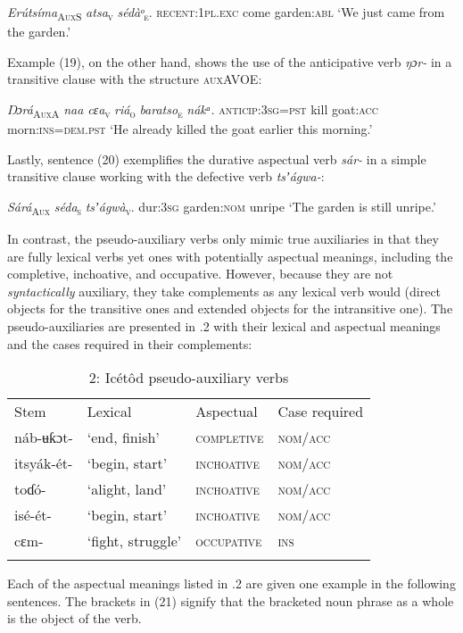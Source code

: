 \textit{Erúts}\textit{íma}\textsc{\textsubscript{AuxS}}   \textit{atsa}\textsc{\textsubscript{v}}\textit{     sédàᵒ}\textsc{\textsubscript{e}}.
\textsc{recent:1pl.exc}   come     garden:\textsc{abl}
‘We just came from the garden.’


Example (19), on the other hand, shows the use of the anticipative verb \textit{ŋɔr-} in a transitive clause with the structure \textsc{auxAVOE}:



\textit{Ŋ}\textit{ɔrá}\textsc{\textsubscript{AuxA}}\textit{ naa   cɛa}\textsc{\textsubscript{v}}\textit{   riá}\textsc{\textsubscript{o}}\textit{        baratso}\textsc{\textsubscript{e}}\textit{ nákᵃ.}
\textsc{anticip:3sg=pst}   kill   goat:\textsc{acc} morn:\textsc{ins=dem.pst}
‘He already killed the goat earlier this morning.’


Lastly, sentence (20) exemplifies the durative aspectual verb \textit{sár-} in a simple transitive clause working with the defective verb \textit{tsʼágwa-}:



\textit{Sárá}\textsc{\textsubscript{Aux}}\textit{  séda}\textsc{\textsubscript{s}}\textit{     tsʼágwà}\textsc{\textsubscript{v}}.
dur:\textsc{3sg}   garden:\textsc{nom}   unripe
‘The garden is still unripe.’


In contrast, the pseudo-auxiliary verbs only mimic true auxiliaries in that they are fully lexical verbs yet ones with potentially aspectual meanings, including the completive, inchoative, and occupative. However, because they are not \textit{syntactically} auxiliary, they take complements as any lexical verb would (direct objects for the transitive ones and extended objects for the intransitive one). The pseudo-auxiliaries are presented in .2 with their lexical and aspectual meanings and the cases required in their complements:


\begin{table}
\caption{2: Icétôd pseudo-auxiliary verbs}
\label{tab:10}


\begin{tabularx}{\textwidth}{XXXX}
\lsptoprule

Stem & Lexical & Aspectual & Case required\\
náb-ʉƙɔt- & ‘end, finish’ & \textsc{completive} & \textsc{nom/acc}\\
itsyák-ét- & ‘begin, start’ & \textsc{inchoative} & \textsc{nom/acc}\\
toɗó- & ‘alight, land’ & \textsc{inchoative} & \textsc{nom/acc}\\
isé-ét- & ‘begin, start’ & \textsc{inchoative} & \textsc{nom/acc}\\
cɛm- & ‘fight, struggle’ & \textsc{occupative} & \textsc{ins}\\
\lspbottomrule
\end{tabularx}
\end{table}
Each of the aspectual meanings listed in .2 are given one example in the following sentences. The brackets in (21) signify that the bracketed noun phrase as a whole is the object of the verb.




